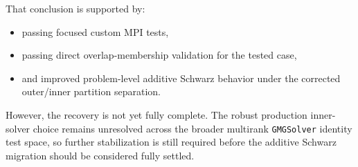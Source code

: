 \documentclass[11pt]{article}
\begin{document}
That conclusion is supported by:
\begin{itemize}
  \item passing focused custom MPI tests,
  \item passing direct overlap-membership validation for the tested case,
  \item and improved problem-level additive Schwarz behavior under the corrected outer/inner partition separation.
\end{itemize}

However, the recovery is not yet fully complete. The robust production inner-solver choice remains unresolved across the broader multirank \texttt{GMGSolver} identity test space, so further stabilization is still required before the additive Schwarz migration should be considered fully settled.
\end{document}
